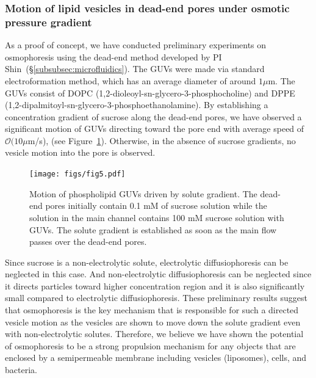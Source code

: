 \documentclass[11pt]{article}
\begin{document}
\subsubsection{Motion of lipid vesicles in dead-end pores under osmotic
pressure gradient}
\label{subsubsec:osmophoresis_lipid_vesicles_deadend_pores}
As a proof of concept, we have conducted preliminary experiments on
osmophoresis using the dead-end method developed by PI
Shin~(\S\ref{subsubsec:microfluidics}).  The GUVs were made via standard
electroformation method, which has an average diameter of around $1
\mu$m. The GUVs consist of DOPC
(1,2-dioleoyl-sn-glycero-3-phosphocholine) and DPPE
(1,2-dipalmitoyl-sn-glycero-3-phosphoethanolamine).  By establishing a
concentration gradient of sucrose along the dead-end pores, we have
observed a significant motion of GUVs directing toward the pore end with
average speed of $\mathcal{O}(10 \mu$m/s), (see Figure~\ref{fig:fig5}).
Otherwise, in the absence of sucrose gradients, no vesicle motion into
the pore is observed.
%
\begin{figure}[h]
\begin{center}
\texttt{[image: figs/fig5.pdf]}
\caption{\label{fig:fig5} Motion of phospholipid GUVs driven by solute
  gradient. The dead-end pores initially contain 0.1 mM of sucrose
  solution while the solution in the main channel contains 100 mM
  sucrose solution with GUVs.  The solute gradient is established as
  soon as the main flow passes over the dead-end pores.}
\end{center}
\end{figure}
Since sucrose is a non-electrolytic solute, electrolytic
diffusiophoresis can be neglected in this case.  And non-electrolytic
diffusiophoresis can be neglected since it directs particles toward
higher concentration region and it is also significantly small compared
to electrolytic diffusiophoresis.  These preliminary results suggest
that osmophoresis is the key mechanism that is responsible for such a
directed vesicle motion as the vesicles are shown to move down the
solute gradient even with non-electrolytic solutes.  Therefore, we
believe we have shown the potential of osmophoresis to be a strong
propulsion mechanism for any objects that are enclosed by a
semipermeable membrane including vesicles (liposomes), cells, and
bacteria.

\end{document}
